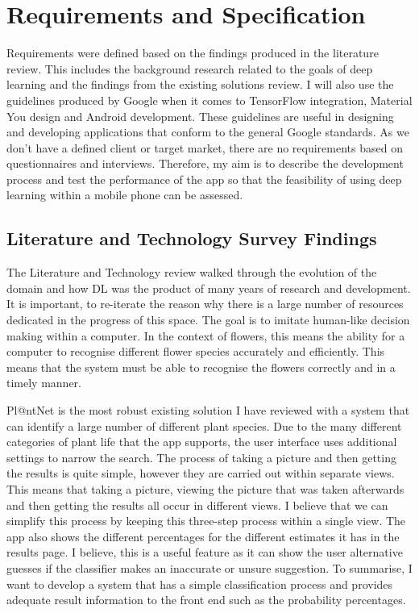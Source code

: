 \documentclass[12pt,a4paper]{report}
\begin{document}
\section{Requirements and Specification}

\label{subsec:req}

Requirements were defined based on the findings produced in the literature review. This includes the background research 
related to the goals of deep learning and the findings from the existing solutions review. I will also use the 
guidelines produced by Google when it comes to TensorFlow integration, Material You design and Android development. 
These guidelines are useful in designing and developing applications that conform to the general Google standards. As we
don't have a defined client or target market, there are no requirements based on questionnaires and interviews. 
Therefore, my aim is to describe the development process and test the performance of the app so that the feasibility of 
using deep learning within a mobile phone can be assessed. 

\subsection{Literature and Technology Survey Findings}

The Literature and Technology review walked through the evolution of the domain and how DL was the product of many years
of research and development. It is important, to re-iterate the reason why there is a large number of resources 
dedicated in the progress of this space. The goal is to imitate human-like decision making within a computer. In the 
context of flowers, this means the ability for a computer to recognise different flower species accurately and 
efficiently. This means that the system must be able to recognise the flowers correctly and in a timely manner.

\par

Pl@ntNet is the most robust existing solution I have reviewed with a system that can identify a large number of 
different plant species. Due to the many different categories of plant life that the app supports, the user interface 
uses additional settings to narrow the search. The process of taking a picture and then getting the results is quite 
simple, however they are carried out within separate views.  This means that taking a picture, viewing the picture that 
was taken afterwards and then getting the results all occur in different views. I believe that we can simplify this 
process by keeping this three-step process within a single view. The app also shows the different percentages for the 
different estimates it has in the results page. I believe, this is a useful feature as it can show the user alternative 
guesses if the classifier makes an inaccurate or unsure suggestion. To summarise, I want to develop a system that has a 
simple classification process and provides adequate result information to the front end such as the probability 
percentages. 
\end{document}

